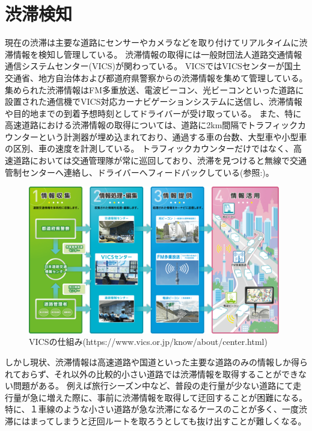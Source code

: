 \newpage

\section{渋滞検知}
現在の渋滞は主要な道路にセンサーやカメラなどを取り付けてリアルタイムに渋滞情報を検知し管理している。
渋滞情報の取得には一般財団法人道路交通情報通信システムセンター(VICS)が関わっている。
VICSではVICSセンターが国土交通省、地方自治体および都道府県警察からの渋滞情報を集めて管理している。
集められた渋滞情報はFM多重放送、電波ビーコン、光ビーコンといった道路に設置された通信機でVICS対応カーナビゲーションシステムに送信し、渋滞情報や目的地までの到着予想時刻としてドライバーが受け取っている。
また、特に高速道路における渋滞情報の取得については、道路に2km間隔でトラフィックカウンターという計測器が埋め込まれており、通過する車の台数、大型車や小型車の区別、車の速度を計測している。
トラフィックカウンターだけではなく、高速道路においては交通管理隊が常に巡回しており、渋滞を見つけると無線で交通管制センターへ連絡し、ドライバーへフィードバックしている(参照:)。

\begin{figure}[htbp]
  \begin{center}
   \includegraphics[width=11cm]{figs/vics.png}
  \end{center}
  \caption{VICSの仕組み(https://www.vics.or.jp/know/about/center.html)}
  \label{fig:vics_system}
\end{figure}

しかし現状、渋滞情報は高速道路や国道といった主要な道路のみの情報しか得られておらず、それ以外の比較的小さい道路では渋滞情報を取得することができない問題がある。
例えば旅行シーズン中など、普段の走行量が少ない道路にて走行量が急に増えた際に、事前に渋滞情報を取得して迂回することが困難になる。
特に、１車線のような小さい道路が急な渋滞になるケースのことが多く、一度渋滞にはまってしまうと迂回ルートを取ろうとしても抜け出すことが難しくなる。

